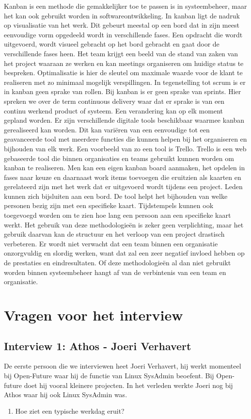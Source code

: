 \documentclass{hogent-article}
\begin{document}
   Kanban is een methode die gemakkelijker toe te passen is in systeembeheer, maar het kan ook gebruikt worden in softwareontwikkeling. In kanban ligt de nadruk op visualisatie van het werk. Dit gebeurt meestal op een bord dat in zijn meest eenvoudige vorm opgedeeld wordt in verschillende fases. Een opdracht die wordt uitgevoerd, wordt visueel gebracht op het bord gebracht en gaat door de verschillende fases heen. Het team krijgt een beeld van de stand van zaken van het project waaraan ze werken en kan meetings organiseren om huidige status te bespreken. Optimalisatie is hier de sleutel om maximale waarde voor de klant te realiseren met zo minimaal mogelijk verspillingen. In tegenstelling tot scrum is er in kanban geen sprake van rollen. Bij kanban is er geen sprake van sprints. Hier spreken we over de term continuous delivery waar dat er sprake is van een continu werkend product of systeem. Een verandering kan op elk moment gepland worden. 
   Er zijn verschillende digitale tools beschikbaar waarmee kanban gerealiseerd kan worden. Dit kan variëren van een eenvoudige tot een geavanceerde tool met meerdere functies die kunnen helpen bij het organiseren en bijhouden van elk werk. Een voorbeeld van zo een tool is Trello. Trello is een web gebaseerde tool die binnen organisaties en teams gebruikt kunnen worden om kanban te realiseren. Men kan een eigen kanban board aanmaken, het opdelen in fases naar keuze en daarnaast work items toevoegen die eruitzien als kaarten en gerelateerd zijn met het werk dat er uitgevoerd wordt tijdens een project. Leden kunnen zich bijsluiten aan een bord. De tool helpt het bijhouden van welke personen bezig zijn met een specifieke kaart. Tijdstempels kunnen ook toegevoegd worden om te zien hoe lang een persoon aan een specifieke kaart werkt. 
   Het gebruik van deze methodologieën is zeker geen verplichting, maar het gebruik daarvan kan de structuur en het verloop van een project drastisch verbeteren. Er wordt niet verwacht dat een team binnen een organisatie onzorgvuldig en slordig werken, want dat zal een zeer negatief invloed hebben op de prestaties en eindresultaten. Of deze methodologieën al dan niet gebruikt worden binnen systeembeheer hangt af van de verbintenis van een team en organisatie. 
   
    
    \section{Vragen voor het interview}    
    \subsection{Interview 1: Athos - Joeri Verhavert}
    De eerste persoon die we interviewen heet Joeri Verhavert, hij werkt momenteel bij Open-Future waar hij de functie van Linux SysAdmin beoefent. Bij Open-future doet hij vooral kleinere projecten. In het verleden werkte Joeri nog bij Athos waar hij ook Linux SysAdmin was. 
    \\
    \begin{enumerate}\bfseries
        \item Hoe ziet een typische werkdag eruit?
    \end{enumerate}
\end{document}
